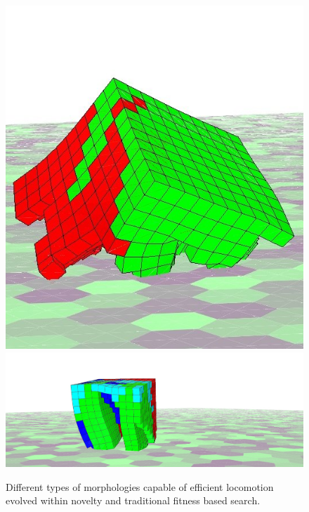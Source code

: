 \begin{figure}[t!]
\includegraphics[height=0.2\textheight]{../Figures/Robots/fit-2-6.jpg}
\includegraphics[height=0.2\textheight]{../Figures/Robots/fit-g2-1-3.jpg}
\caption{Different types of morphologies capable of efficient locomotion evolved within novelty and traditional fitness based search.}
\label{fig:introPictureRobots}
\end{figure}

